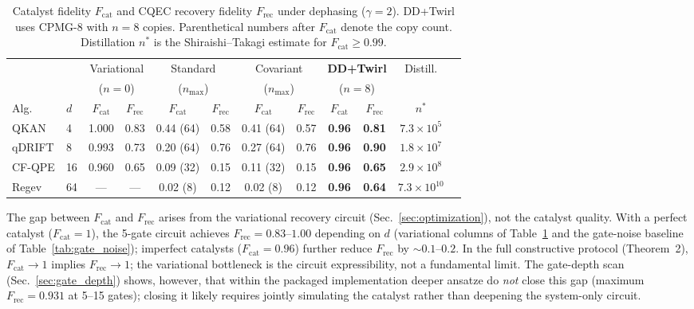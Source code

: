 \documentclass[pra,twocolumn,superscriptaddress,longbibliography,floatfix]{revtex4-2}
\begin{document}
\begin{table}[t]
\caption{Catalyst fidelity $F_\mathrm{cat}$ and CQEC recovery fidelity $F_\mathrm{rec}$ under dephasing ($\gamma = 2$). DD+Twirl uses CPMG-8 with $n = 8$ copies. Parenthetical numbers after $F_\mathrm{cat}$ denote the copy count. Distillation $n^*$ is the Shiraishi--Takagi estimate for $F_\mathrm{cat} \geq 0.99$.}
\label{tab:unified_comparison}
\centering\footnotesize
\setlength{\tabcolsep}{4pt}
\begin{tabular}{@{}llcccccccccc@{}}
\toprule
& & \multicolumn{2}{c}{Variational} & \multicolumn{2}{c}{Standard} & \multicolumn{2}{c}{Covariant} & \multicolumn{2}{c}{\textbf{DD+Twirl}} & Distill. \\
& & \multicolumn{2}{c}{($n=0$)} & \multicolumn{2}{c}{($n_\mathrm{max}$)} & \multicolumn{2}{c}{($n_\mathrm{max}$)} & \multicolumn{2}{c}{($n=8$)} & \\
\cmidrule(r){3-4}\cmidrule(r){5-6}\cmidrule(r){7-8}\cmidrule(r){9-10}
Alg. & $d$ & $F_\mathrm{cat}$ & $F_\mathrm{rec}$ & $F_\mathrm{cat}$ & $F_\mathrm{rec}$ & $F_\mathrm{cat}$ & $F_\mathrm{rec}$ & $F_\mathrm{cat}$ & $F_\mathrm{rec}$ & $n^*$ \\
\midrule
QKAN   & 4  & 1.000 & 0.83 & 0.44 (64) & 0.58 & 0.41 (64) & 0.57 & \textbf{0.96} & \textbf{0.81} & $7.3{\times}10^5$ \\
qDRIFT & 8  & 0.993 & 0.73 & 0.20 (64) & 0.76 & 0.27 (64) & 0.76 & \textbf{0.96} & \textbf{0.90} & $1.8{\times}10^7$ \\
CF-QPE & 16 & 0.960 & 0.65 & 0.09 (32) & 0.15 & 0.11 (32) & 0.15 & \textbf{0.96} & \textbf{0.65} & $2.9{\times}10^8$ \\
Regev  & 64 & ---   & ---  & 0.02 (8)  & 0.12 & 0.02 (8)  & 0.12 & \textbf{0.96} & \textbf{0.64} & $7.3{\times}10^{10}$ \\
\bottomrule
\end{tabular}
\end{table}

The gap between $F_\mathrm{cat}$ and $F_\mathrm{rec}$ arises from the variational recovery circuit (Sec.~\ref{sec:optimization}), not the catalyst quality.
With a perfect catalyst ($F_\mathrm{cat} = 1$), the 5-gate circuit achieves $F_\mathrm{rec} = 0.83$--$1.00$ depending on $d$ (variational columns of Table~\ref{tab:unified_comparison} and the gate-noise baseline of Table~\ref{tab:gate_noise}); imperfect catalysts ($F_\mathrm{cat} = 0.96$) further reduce $F_\mathrm{rec}$ by $\sim\!0.1$--$0.2$.
In the full constructive protocol (Theorem~2), $F_\mathrm{cat} \to 1$ implies $F_\mathrm{rec} \to 1$; the variational bottleneck is the circuit expressibility, not a fundamental limit.
The gate-depth scan (Sec.~\ref{sec:gate_depth}) shows, however, that within the packaged implementation deeper ansatze do \emph{not} close this gap (maximum $F_\mathrm{rec} = 0.931$ at 5--15 gates); closing it likely requires jointly simulating the catalyst rather than deepening the system-only circuit.
\end{document}

